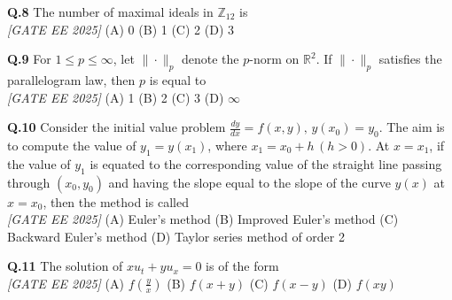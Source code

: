 \documentclass[11pt]{article}
\begin{document}
\begin{flushleft}

\textbf{Q.8} The number of maximal ideals in $\mathbb{Z}_{12}$ is
\\[1ex] \textit{[GATE EE 2025]}
\newline
(A) 0 \hspace{1cm} (B) 1 \hspace{1cm} (C) 2 \hspace{1cm} (D) 3
\newline



\textbf{Q.9} For $1 \leq p \leq \infty$, let $\| \cdot \|_p$ denote the $p$-norm on $\mathbb{R}^2$. If $\| \cdot \|_p$ satisfies the parallelogram law, then $p$ is equal to
\\[1ex] \textit{[GATE EE 2025]}
\newline
(A) 1 \hspace{1cm} (B) 2 \hspace{1cm} (C) 3 \hspace{1cm} (D) $\infty$
\newline
\newline

\textbf{Q.10} Consider the initial value problem $\frac{dy}{dx} = f(x, y), \, y(x_0) = y_0$. The aim is to compute the value of $y_1 = y(x_1)$, where $x_1 = x_0 + h \, (h > 0)$. At $x = x_1$, if the value of $y_1$ is equated to the corresponding value of the straight line passing through $(x_0, y_0)$ and having the slope equal to the slope of the curve $y(x)$ at $x = x_0$, then the method is called
\\[1ex] \textit{[GATE EE 2025]}
\newline
(A) Euler's method \hspace{0.5cm} (B) Improved Euler's method \hspace{0.5cm} (C) Backward Euler's method \hspace{0.5cm} (D) Taylor series method of order 2



\textbf{Q.11} The solution of $xu_t + yu_x = 0$ is of the form
\\[1ex] \textit{[GATE EE 2025]}
\newline
(A) $f\left(\frac{y}{x}\right)$ \hspace{1cm} (B) $f(x+y)$ \hspace{1cm} (C) $f(x - y)$ \hspace{1cm} (D) $f(xy)$



\end{flushleft}
\end{document}
